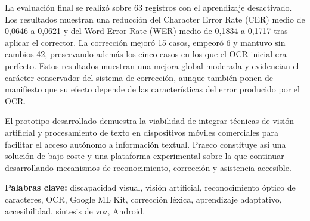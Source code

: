 La evaluación final se realizó sobre 63 registros con el aprendizaje desactivado. Los resultados muestran una reducción del Character Error Rate (CER) medio de 0,0646 a 0,0621 y del Word Error Rate (WER) medio de 0,1834 a 0,1717 tras aplicar el corrector. La corrección mejoró 15 casos, empeoró 6 y mantuvo sin cambios 42, preservando además los cinco casos en los que el OCR inicial era perfecto. Estos resultados muestran una mejora global moderada y evidencian el carácter conservador del sistema de corrección, aunque también ponen de manifiesto que su efecto depende de las características del error producido por el OCR.

El prototipo desarrollado demuestra la viabilidad de integrar técnicas de visión artificial y procesamiento de texto en dispositivos móviles comerciales para facilitar el acceso autónomo a información textual. Praeco constituye así una solución de bajo coste y una plataforma experimental sobre la que continuar desarrollando mecanismos de reconocimiento, corrección y asistencia accesible.

\textbf{Palabras clave:} discapacidad visual, visión artificial, reconocimiento óptico de caracteres, OCR, Google ML Kit, corrección léxica, aprendizaje adaptativo, accesibilidad, síntesis de voz, Android.
